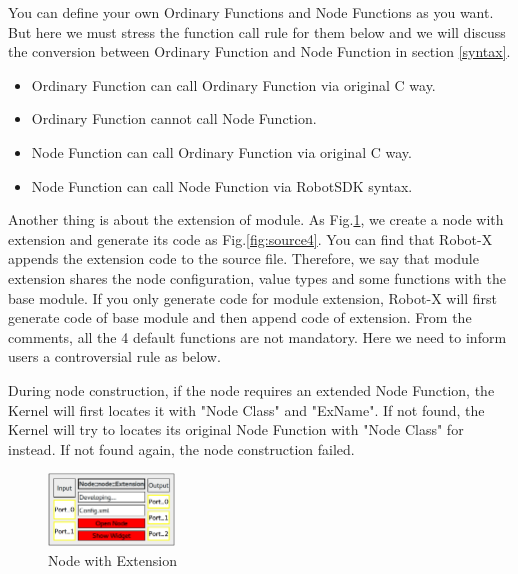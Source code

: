 \documentclass[a4paper,10pt]{book}
\begin{document}
You can define your own Ordinary Functions and Node Functions as you want. But here we must stress the function call rule for them below and we will discuss the conversion between Ordinary Function and Node Function in section \ref{syntax}.

\begin{framed}
 \begin{itemize}
  \item Ordinary Function can call Ordinary Function via original C way.
  \item Ordinary Function cannot call Node Function.
  \item Node Function can call Ordinary Function via original C way.
  \item Node Function can call Node Function via RobotSDK syntax.
 \end{itemize}
\end{framed}

Another thing is about the extension of module. As Fig.\ref{fig:source3}, we create a node with extension and generate its code as Fig.\ref{fig:source4}. You can find that Robot-X appends the extension code to the source file. Therefore, we say that module extension shares the node configuration, value types and some functions with the base module. If you only generate code for module extension, Robot-X will first generate code of base module and then append code of extension. From the comments, all the 4 default functions are not mandatory. Here we need to inform users a controversial rule as below.

\begin{framed}
 During node construction, if the node requires an extended Node Function, the Kernel will first locates it with "Node Class" and "ExName". If not found, the Kernel will try to locates its original Node Function with "Node Class" for instead. If not found again, the node construction failed. 
\end{framed}

\begin{figure}
 \centering
 \includegraphics[width=0.3\textwidth]{img/source3.eps}
 \caption{Node with Extension}
 \label{fig:source3}
\end{figure}
\end{document}
